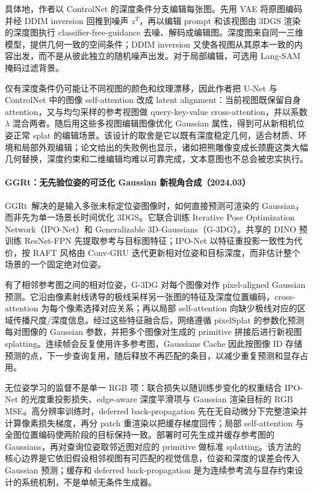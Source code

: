 具体地，作者以 ControlNet 的深度条件分支编辑每张图。先用 VAE 将原图编码并经 DDIM inversion 回推到噪声 $z^T$，再以编辑 prompt 和该视图由 3DGS 渲染的深度图执行 classifier-free-guidance 去噪、解码成编辑图。深度图来自同一三维模型，提供几何一致的空间条件；DDIM inversion 又使各视图从其原本一致的内容出发，而不是从彼此独立的随机噪声出发。对于局部编辑，可选用 Lang-SAM 掩码过滤背景。

仅有深度条件仍可能让不同视图的颜色和纹理漂移，因此作者把 U-Net 与 ControlNet 中的图像 self-attention 改成 latent alignment：当前视图既保留自身 attention，又与均匀采样的参考视图做 query-key-value cross-attention，并以系数 $\lambda$ 混合两者。随后用这些多视图编辑图像优化 Gaussian 属性，得到可从新相机位姿正常 splat 的编辑场景。该设计的取舍是它以既有深度稳定几何，适合材质、环境和局部外观编辑；论文给出的失败例也显示，诸如把熊雕像变成长颈鹿这类大幅几何替换，深度约束和二维编辑均难以可靠完成，文本意图也不总会被忠实执行。


\paragraph{GGRt：无先验位姿的可泛化 Gaussian 新视角合成（2024.03）}
GGRt~\cite{2403_10147}解决的是输入多张未标定位姿图像时，如何直接预测可渲染的 Gaussian，而非先为单一场景长时间优化 3DGS。它联合训练 Iterative Pose Optimization Network（IPO-Net）和 Generalizable 3D-Gaussians（G-3DG）。共享的 DINO 预训练 ResNet-FPN 先提取参考与目标图特征；IPO-Net 以特征重投影一致性为代价，按 RAFT 风格由 Conv-GRU 迭代更新相对位姿和目标深度，而非估计整个场景的一个固定绝对位姿。

有了相邻参考图之间的相对位姿，G-3DG 对每个图像对作 pixel-aligned Gaussian 预测。它沿由像素射线诱导的极线采样另一张图的特征及深度位置编码，cross-attention 为每个像素选择对应关系；再以局部 self-attention 向缺少极线对应的区域传播尺度/深度信息。经过这些特征融合后，网络遵循 pixelSplat 的参数化预测每对图像的 Gaussian 参数，并把多个图像对生成的 primitive 拼接后进行新视图 splatting。连续帧会反复使用许多参考图，Gaussians Cache 因此按图像 ID 存储预测的点，下一步查询复用，随后释放不再匹配的条目，以减少重复预测和显存占用。

无位姿学习的监督不是单一 RGB 项：联合损失以随训练步变化的权重结合 IPO-Net 的光度重投影损失、edge-aware 深度平滑项与 Gaussian 渲染目标的 RGB MSE。高分辨率训练时，deferred back-propagation 先在无自动微分下完整渲染并计算像素损失梯度，再分 patch 重渲染以把缓存梯度回传；局部 self-attention 与全图位置编码使两阶段的目标保持一致。部署时可先生成并缓存参考图的 Gaussians，再对查询位姿取邻近图对应的 primitive 做标准 splatting。该方法的核心边界是它依旧假设相邻视图有可匹配的视觉信息，位姿和深度的误差会传入 Gaussian 预测；缓存和 deferred back-propagation 是为连续参考流与显存约束设计的系统机制，不是单帧无条件生成器。


